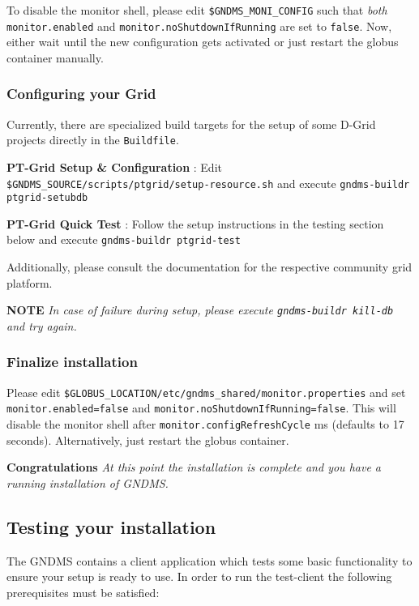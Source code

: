\documentclass{article}
\begin{document}
To disable the monitor shell, please edit \verb!$GNDMS_MONI_CONFIG!
such that \emph{both} \verb!monitor.enabled! and
\verb!monitor.noShutdownIfRunning! are set to \verb!false!. Now,
either wait until the new configuration gets activated or just
restart the globus container manually.

\subsubsection{Configuring your Grid}

Currently, there are specialized build targets for the setup of
some D-Grid projects directly in the \verb!Buildfile!.

\textbf{PT-Grid Setup \& Configuration} : Edit
\verb!$GNDMS_SOURCE/scripts/ptgrid/setup-resource.sh! and execute
\verb!gndms-buildr ptgrid-setubdb!

\textbf{PT-Grid Quick Test} : Follow the setup instructions in the
testing section below and execute \verb!gndms-buildr ptgrid-test!

Additionally, please consult the documentation for the respective
community grid platform.

\textbf{NOTE}
\emph{In case of failure during setup, please execute \texttt{gndms-buildr kill-db} and try again.}

\subsubsection{Finalize installation}

Please edit
\verb!$GLOBUS_LOCATION/etc/gndms_shared/monitor.properties! and set
\verb!monitor.enabled=false! and
\verb!monitor.noShutdownIfRunning=false!. This will disable the
monitor shell after \verb!monitor.configRefreshCycle! ms (defaults
to 17 seconds). Alternatively, just restart the globus container.

\textbf{Congratulations}
\emph{At this point the installation is complete and you have a running installation of GNDMS.}

\subsection{Testing your installation}

The GNDMS contains a client application which tests some basic
functionality to ensure your setup is ready to use. In order to run
the test-client the following prerequisites must be satisfied:
\end{document}
